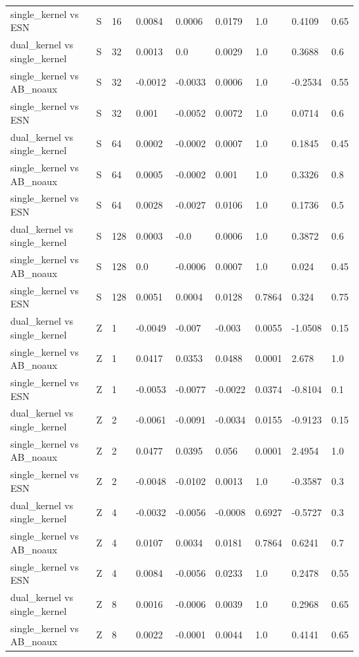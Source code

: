 \begin{table}
\begin{ruledtabular}
\begin{tabular}{lllllllll}
single_kernel vs ESN & S & 16 & 0.0084 & 0.0006 & 0.0179 & 1.0 & 0.4109 & 0.65 \\
dual_kernel vs single_kernel & S & 32 & 0.0013 & 0.0 & 0.0029 & 1.0 & 0.3688 & 0.6 \\
single_kernel vs AB_noaux & S & 32 & -0.0012 & -0.0033 & 0.0006 & 1.0 & -0.2534 & 0.55 \\
single_kernel vs ESN & S & 32 & 0.001 & -0.0052 & 0.0072 & 1.0 & 0.0714 & 0.6 \\
dual_kernel vs single_kernel & S & 64 & 0.0002 & -0.0002 & 0.0007 & 1.0 & 0.1845 & 0.45 \\
single_kernel vs AB_noaux & S & 64 & 0.0005 & -0.0002 & 0.001 & 1.0 & 0.3326 & 0.8 \\
single_kernel vs ESN & S & 64 & 0.0028 & -0.0027 & 0.0106 & 1.0 & 0.1736 & 0.5 \\
dual_kernel vs single_kernel & S & 128 & 0.0003 & -0.0 & 0.0006 & 1.0 & 0.3872 & 0.6 \\
single_kernel vs AB_noaux & S & 128 & 0.0 & -0.0006 & 0.0007 & 1.0 & 0.024 & 0.45 \\
single_kernel vs ESN & S & 128 & 0.0051 & 0.0004 & 0.0128 & 0.7864 & 0.324 & 0.75 \\
dual_kernel vs single_kernel & Z & 1 & -0.0049 & -0.007 & -0.003 & 0.0055 & -1.0508 & 0.15 \\
single_kernel vs AB_noaux & Z & 1 & 0.0417 & 0.0353 & 0.0488 & 0.0001 & 2.678 & 1.0 \\
single_kernel vs ESN & Z & 1 & -0.0053 & -0.0077 & -0.0022 & 0.0374 & -0.8104 & 0.1 \\
dual_kernel vs single_kernel & Z & 2 & -0.0061 & -0.0091 & -0.0034 & 0.0155 & -0.9123 & 0.15 \\
single_kernel vs AB_noaux & Z & 2 & 0.0477 & 0.0395 & 0.056 & 0.0001 & 2.4954 & 1.0 \\
single_kernel vs ESN & Z & 2 & -0.0048 & -0.0102 & 0.0013 & 1.0 & -0.3587 & 0.3 \\
dual_kernel vs single_kernel & Z & 4 & -0.0032 & -0.0056 & -0.0008 & 0.6927 & -0.5727 & 0.3 \\
single_kernel vs AB_noaux & Z & 4 & 0.0107 & 0.0034 & 0.0181 & 0.7864 & 0.6241 & 0.7 \\
single_kernel vs ESN & Z & 4 & 0.0084 & -0.0056 & 0.0233 & 1.0 & 0.2478 & 0.55 \\
dual_kernel vs single_kernel & Z & 8 & 0.0016 & -0.0006 & 0.0039 & 1.0 & 0.2968 & 0.65 \\
single_kernel vs AB_noaux & Z & 8 & 0.0022 & -0.0001 & 0.0044 & 1.0 & 0.4141 & 0.65 \\

\end{tabular}
\end{ruledtabular}
\end{table}
